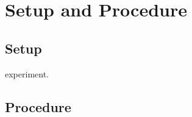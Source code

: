 \documentclass{article}
\begin{document}
\section{Setup and Procedure}
\subsection{Setup}
experiment.
\subsection{Procedure}
\end{document}
